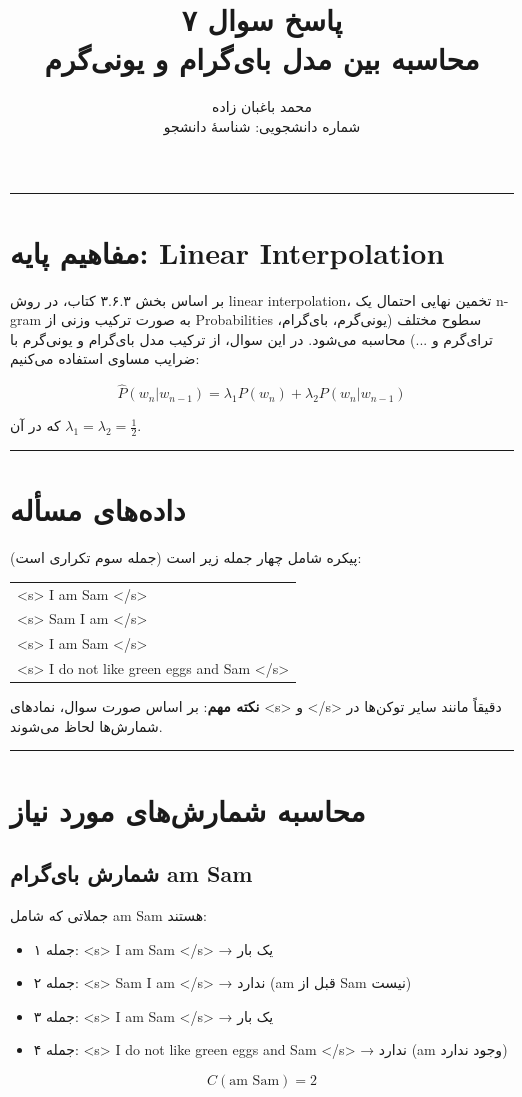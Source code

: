 \documentclass[11pt,a4paper]{article}
\title{\textbf{پاسخ سوال ۷} \\[0.4cm] \footnotesize محاسبه \en{Linear Interpolation} بین مدل بای‌گرام و یونی‌گرم}
\author{محمد باغبان زاده \\ شماره دانشجویی: شناسهٔ دانشجو}
\date{}
\newcommand{\en}[1]{\textenglish{#1}}
\newcommand{\separator}{\vspace{1em}\noindent\rule{\linewidth}{0.4pt}\vspace{1em}}
\newcommand{\thickseparator}{\vspace{1em}\noindent\rule{\linewidth}{1pt}\vspace{1em}}
\begin{document}
\maketitle
\thickseparator

\section{مفاهیم پایه: \en{Linear Interpolation}}
بر اساس بخش ۳.۶.۳ کتاب، در روش \en{linear interpolation}، تخمین نهایی احتمال یک n-gram به صورت ترکیب وزنی از Probabilities سطوح مختلف (یونی‌گرم، بای‌گرام، ترای‌گرم و ...) محاسبه می‌شود. در این سوال، از ترکیب مدل بای‌گرام و یونی‌گرم با ضرایب مساوی استفاده می‌کنیم:

\[
\hat{P}(w_n|w_{n-1}) = \lambda_1 P(w_n) + \lambda_2 P(w_n|w_{n-1})
\]

که در آن $\lambda_1 = \lambda_2 = \frac{1}{2}$.

\separator
\section{داده‌های مسأله}
پیکره شامل چهار جمله زیر است (جمله سوم تکراری است):

\begin{center}
\begin{tabular}{l}
\en{<s> I am Sam </s>} \\
\en{<s> Sam I am </s>} \\
\en{<s> I am Sam </s>} \\
\en{<s> I do not like green eggs and Sam </s>}
\end{tabular}
\end{center}

\textbf{نکته مهم}: بر اساس صورت سوال، نمادهای \en{<s>} و \en{</s>} دقیقاً مانند سایر توکن‌ها در شمارش‌ها لحاظ می‌شوند.

\separator
\newpage
\section{محاسبه شمارش‌های مورد نیاز}

\subsection*{شمارش بای‌گرام \en{am Sam}}
جملاتی که شامل \en{am Sam} هستند:
\begin{itemize}
\item جمله ۱: \en{<s> I am Sam </s>} → یک بار
\item جمله ۲: \en{<s> Sam I am </s>} → ندارد (\en{am} قبل از \en{Sam} نیست)
\item جمله ۳: \en{<s> I am Sam </s>} → یک بار
\item جمله ۴: \en{<s> I do not like green eggs and Sam </s>} → ندارد (\en{am} وجود ندارد)
\end{itemize}
\[
C(\text{am Sam}) = 2
\]
\end{document}
